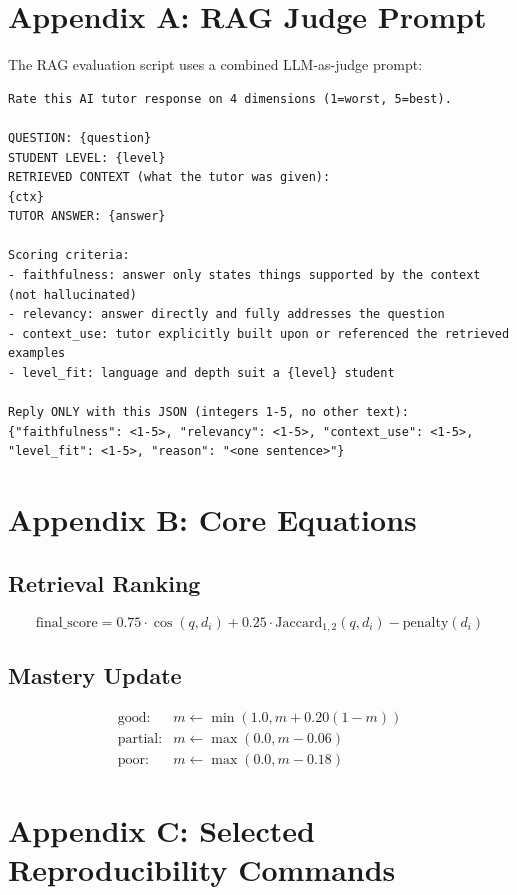 \documentclass[11pt,a4paper]{article}
\begin{document}
\section{Appendix A: RAG Judge Prompt}

The RAG evaluation script uses a combined LLM-as-judge prompt:

\begin{lstlisting}
Rate this AI tutor response on 4 dimensions (1=worst, 5=best).

QUESTION: {question}
STUDENT LEVEL: {level}
RETRIEVED CONTEXT (what the tutor was given):
{ctx}
TUTOR ANSWER: {answer}

Scoring criteria:
- faithfulness: answer only states things supported by the context (not hallucinated)
- relevancy: answer directly and fully addresses the question
- context_use: tutor explicitly built upon or referenced the retrieved examples
- level_fit: language and depth suit a {level} student

Reply ONLY with this JSON (integers 1-5, no other text):
{"faithfulness": <1-5>, "relevancy": <1-5>, "context_use": <1-5>, "level_fit": <1-5>, "reason": "<one sentence>"}
\end{lstlisting}

\section{Appendix B: Core Equations}

\subsection{Retrieval Ranking}
\[
\text{final\_score} = 0.75 \cdot \cos(q, d_i) + 0.25 \cdot \text{Jaccard}_{1,2}(q,d_i) - \text{penalty}(d_i)
\]

\subsection{Mastery Update}
\[
\begin{array}{ll}
\text{good:} & m \leftarrow \min(1.0, m + 0.20(1-m)) \\
\text{partial:} & m \leftarrow \max(0.0, m - 0.06) \\
\text{poor:} & m \leftarrow \max(0.0, m - 0.18)
\end{array}
\]

\section{Appendix C: Selected Reproducibility Commands}
\end{document}
